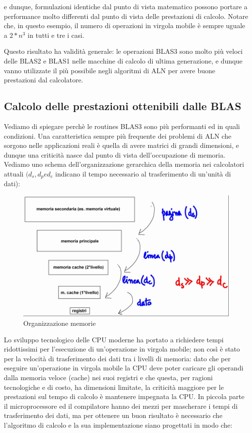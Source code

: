 e dunque, formulazioni identiche dal punto di vista matematico possono portare a performance molto differenti dal punto di vista delle prestazioni di calcolo. Notare che, in questo esempio, il numero di operazioni in virgola mobile è sempre uguale a $2*n^3$ in tutti e tre i casi.

Questo risultato ha validità generale: le operazioni BLAS3 sono molto più veloci delle BLAS2 e BLAS1 nelle macchine di calcolo di ultima generazione, e dunque vanno utilizzate il più possibile negli algoritmi di ALN per avere buone prestazioni dal calcolatore.

\subsection{Calcolo delle prestazioni ottenibili dalle BLAS}

Vediamo di spiegare perchè le routines BLAS3 sono più performanti ed in quali condizioni. Una caratteristica sempre più frequente dei problemi di ALN che sorgono nelle applicazioni reali è quella di avere matrici di grandi dimensioni, e dunque una criticità nasce dal punto di vista dell'occupazione di memoria.
Vediamo uno schema dell'organizzazione gerarchica della memoria nei calcolatori attuali $(d_s, d_p e d_c$ indicano il tempo necessario al trasferimento di un'unità di dati):

\begin{figure}[ht!]
\centering
\includegraphics[width=130mm]{images/organizzazione_memorie.JPG}
\caption{Organizzazione memorie}
\label{overflow}
\end{figure}

Lo sviluppo tecnologico delle CPU moderne ha portato a richiedere tempi ridottissimi per l'esecuzione di un'operazione in virgola mobile; non così è stato per la velocità di trasferimento dei dati tra i livelli di memoria: dato che per eseguire un'operazione in virgola mobile la CPU deve poter caricare gli operandi dalla memoria veloce (cache) nei suoi registri e che questa, per ragioni tecnologiche e di costo, ha dimensioni limitate, la criticità maggiore per le prestazioni sul tempo di calcolo è mantenere impegnata la CPU.
In piccola parte il microprocessore ed il compilatore hanno dei mezzi per mascherare i tempi di trasferimento dei dati, ma per ottenere un buon risultato è necessario che l'algoritmo di calcolo e la sua implementazione siano progettati in modo che:

